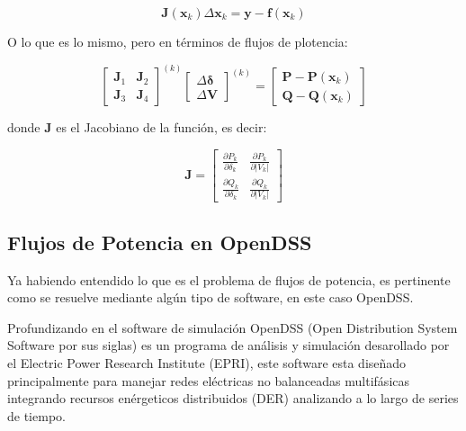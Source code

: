 \documentclass[11pt, letterpaper]{article}
\begin{document}
\begin{equation*}
    \bm{J}(\bm{x}_k)\bm{\varDelta x}_k = \bm{y}-\bm{f}(\bm{x}_k)
\end{equation*}
\begin{center}
    O lo que es lo mismo, pero en términos de flujos de plotencia:
\end{center}
\begin{equation}
\begin{bmatrix}
\mathbf{J}_1 & \mathbf{J}_2 \\
\mathbf{J}_3 & \mathbf{J}_4
\end{bmatrix}^{(k)}
\begin{bmatrix}
\Delta \boldsymbol{\delta} \\
\Delta \mathbf{V}
\end{bmatrix}^{(k)}
=
\begin{bmatrix}
\mathbf{P} - \mathbf{P}(\mathbf{x}_k) \\
\mathbf{Q} - \mathbf{Q}(\mathbf{x}_k)
\end{bmatrix}
\label{N-R_Flujo de Potencia}
\end{equation}

\begin{center}
    donde $ \bm{J} $ es el Jacobiano de la función, es decir:
\end{center}
\begin{equation*}
    \bm{J} = \begin{bmatrix}
       \frac{\partial P_k}{\partial \delta_k} & \frac{\partial P_k}{\partial |V_k|} \\[1.5ex]
       \frac{\partial Q_k}{\partial \delta_k} & \frac{\partial Q_k}{\partial |V_k|}
    \end{bmatrix}
\end{equation*}

\subsection{Flujos de Potencia en OpenDSS}
\label{F_P OpenDSS}

Ya habiendo entendido lo que es el problema de flujos de potencia, es pertinente como se resuelve mediante algún tipo de software, en este caso OpenDSS.

Profundizando en el software de simulación OpenDSS (Open Distribution System Software por sus siglas) es un programa de análisis y simulación
desarollado por el Electric Power Research Institute (EPRI), este software esta diseñado principalmente para manejar redes eléctricas no balanceadas
multifásicas integrando recursos enérgeticos distribuidos (DER) analizando a lo largo de series de tiempo.
\end{document}
